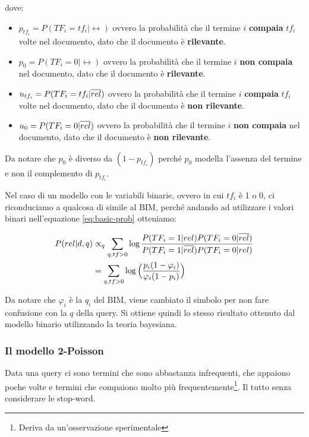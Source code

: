 \noindent dove:

\begin{itemize}
\item $p_{tf_i} =  P(TF_i = tf_i | \rel) $ ovvero la probabilità che il termine $i$ \textbf{compaia} $tf_i$ volte nel documento, dato che il documento è \textbf{rilevante}.
\item $p_0 = P(TF_i = 0 | \rel) $ ovvero la probabilità che il termine $i$ \textbf{non compaia} nel documento, dato che il documento è \textbf{rilevante}.
\item $u_{tf_i} =  P(TF_i = tf_i | \overline{rel}) $ ovvero la probabilità che il termine $i$ \textbf{compaia} $tf_i$ volte nel documento, dato che il documento è \textbf{non rilevante}.
\item $u_0 = P(TF_i = 0 | \overline{rel}) $ ovvero la probabilità che il termine $i$ \textbf{non compaia} nel documento, dato che il documento è \textbf{non rilevante}.
\end{itemize}

Da notare che $p_0$ è diverso da $(1-p_{tf_i})$ perché $p_0$ modella l'assenza del termine e non il complemento di $p_{tf_i}$.

Nel caso di un modello con le variabili binarie, ovvero in cui $tf_i$ è 1 o 0, ci riconduciamo a qualcosa di simile al BIM, perché andando ad utilizzare i valori binari nell'equazione \ref{eq:basic-prob} otteniamo:

\begin{align}
P(rel | d,q) &\propto_q \sum_{q, tf>0} \log\frac{ P(TF_i = 1 | rel) P(TF_i = 0 | \overline{rel}) }{P(TF_i = 1 | \overline{rel}) P(TF_i = 0 | rel)} \\
&= \sum_{q, tf>0} \log \Big(  \frac{p_i (1-\varphi_i)}{\varphi_i(1-p_i)} \Big)
\end{align}

Da notare che $\varphi_i$ è la $q_i$ del BIM, viene cambiato il simbolo per non fare confusione con la $q$ della query. 
Si ottiene quindi lo stesso risultato ottenuto dal modello binario utilizzando la teoria bayesiana.

\subsubsection{Il modello 2-Poisson}

Data una query ci sono termini che sono abbastanza infrequenti, che appaiono poche volte e termini che compaiono molto più frequentemente\footnote{Deriva da un'osservazione sperimentale}. Il tutto senza considerare le stop-word.


